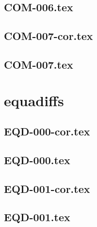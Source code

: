 \renewcommand{\xxexo}{COM-006.tex} 
\subsection*{\xxexo} 
\graphicspath{{../../exoscomplexite/equadiffs/\xxexo/}}
 
 
\renewcommand{\xxexo}{COM-007-cor.tex} 
\subsection*{\xxexo} 
\graphicspath{{../../exoscomplexite/equadiffs/\xxexo/}}
 
 
\renewcommand{\xxexo}{COM-007.tex} 
\subsection*{\xxexo} 
\graphicspath{{../../exoscomplexite/equadiffs/\xxexo/}}
 
 
\section*{equadiffs}
\renewcommand{\xxexo}{EQD-000-cor.tex} 
\subsection*{\xxexo} 
\graphicspath{{../../exosequadiffs/equadiffs/\xxexo/}}
 
 
\renewcommand{\xxexo}{EQD-000.tex} 
\subsection*{\xxexo} 
\graphicspath{{../../exosequadiffs/equadiffs/\xxexo/}}
 
 
\renewcommand{\xxexo}{EQD-001-cor.tex} 
\subsection*{\xxexo} 
\graphicspath{{../../exosequadiffs/equadiffs/\xxexo/}}
 
 
\renewcommand{\xxexo}{EQD-001.tex} 
\subsection*{\xxexo} 
\graphicspath{{../../exosequadiffs/equadiffs/\xxexo/}}
 
 
